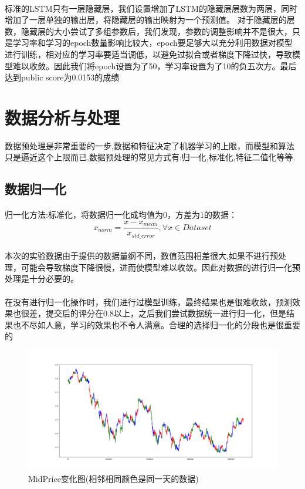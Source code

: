 \documentclass[UTF8]{ctexart}
\begin{document}
\paragraph{}标准的LSTM只有一层隐藏层，我们设置增加了LSTM的隐藏层层数为两层，同时增加了一层单独的输出层，将隐藏层的输出映射为一个预测值。
对于隐藏层的层数，隐藏层的大小尝试了多组参数后，我们发现，参数的调整影响并不是很大，只是学习率和学习的epoch数量影响比较大，epoch要足够大以充分利用数据对模型进行训练，相对应的学习率要适当调低，以避免过拟合或者梯度下降过快，导致模型难以收敛。因此我们将epoch设置为了50，学习率设置为了10的负五次方。最后达到public score为0.0153的成绩
\section{数据分析与处理}
数据预处理是非常重要的一步,数据和特征决定了机器学习的上限，而模型和算法只是逼近这个上限而已,数据预处理的常见方式有:归一化,标准化,特征二值化等等.
\subsection{数据归一化}
\paragraph{}归一化方法:标准化，将数据归一化成均值为0，方差为1的数据：
$$x_{norm} = \frac{x - x_{mean}}{x_{std\_error}},\forall x \in Dataset $$

\paragraph{}本次的实验数据由于提供的数据量纲不同，数值范围相差很大,如果不进行预处理，可能会导致梯度下降很慢，进而使模型难以收敛。因此对数据的进行归一化预处理是十分必要的。
\paragraph{}在没有进行归一化操作时，我们进行过模型训练，最终结果也是很难收敛，预测效果也很差，提交后的评分在0.8以上，之后我们尝试数据统一进行归一化，但是结果也不尽如人意，学习的效果也不令人满意。合理的选择归一化的分段也是很重要的
\begin{figure}[!htbp]
    \centering
    \includegraphics[scale = 0.3]{p8.png}
    \caption{MidPrice变化图(相邻相同颜色是同一天的数据)}
\end{figure}
\end{document}
